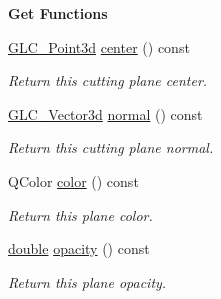 \begin{Indent}{\bf Get Functions}\par
\begin{DoxyCompactItemize}
\item 
\hyperlink{glc__vector3d_8h_a4e13a9bbc7ab3d34de7e98b41836772c}{G\-L\-C\-\_\-\-Point3d} \hyperlink{class_g_l_c___cutting_plane_af58a0f0ccbbd7b02f754397241558b8c}{center} () const 
\begin{DoxyCompactList}\small\item\em Return this cutting plane center. \end{DoxyCompactList}\item 
\hyperlink{class_g_l_c___vector3d}{G\-L\-C\-\_\-\-Vector3d} \hyperlink{class_g_l_c___cutting_plane_af469fadf296434eee46c4ba187ed07e6}{normal} () const 
\begin{DoxyCompactList}\small\item\em Return this cutting plane normal. \end{DoxyCompactList}\item 
Q\-Color \hyperlink{class_g_l_c___cutting_plane_a2072a6fa23ee3008be13b1243494e555}{color} () const 
\begin{DoxyCompactList}\small\item\em Return this plane color. \end{DoxyCompactList}\item 
\hyperlink{_super_l_u_support_8h_a8956b2b9f49bf918deed98379d159ca7}{double} \hyperlink{class_g_l_c___cutting_plane_a23c0d810579c076c5e2f86c64bb6051f}{opacity} () const 
\begin{DoxyCompactList}\small\item\em Return this plane opacity. \end{DoxyCompactList}\end{DoxyCompactItemize}
\end{Indent}
